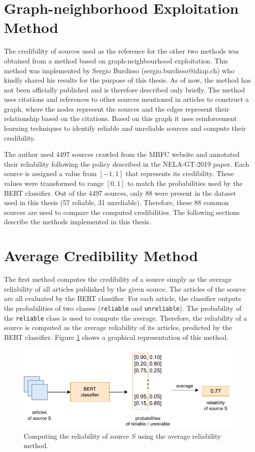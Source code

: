 \section{Graph-neighborhood Exploitation Method}
The credibility of sources used as the reference for the other two methods was obtained from a method based on graph-neighbourhood exploitation. This method was implemented by Sergio Burdisso (sergio.burdisso@idiap.ch) who kindly shared his results for the purpose of this thesis. As of now, the method has not been officially published and is therefore described only briefly. The method uses citations and references to other sources mentioned in articles to construct a graph, where the nodes represent the sources and the edges represent their relationship based on the citations. Based on this graph it uses reinforcement learning techniques to identify reliable and unreliable sources and compute their credibility. 

The author used 4497 sources crawled from the MBFC website and annotated their reliability following the policy described in the NELA-GT-2019 paper. Each source is assigned a value from $[-1, 1]$ that represents its credibility. These values were transformed to range $[0,1]$ to match the probabilities used by the BERT classifier. Out of the 4497 sources, only 88 were present in the dataset used in this thesis (57 reliable, 31 unreliable). Therefore, these 88 common sources are used to compare the computed credibilities. The following sections describe the methods implemented in this thesis.


\pagebreak

\section{Average Credibility Method}
The first method computes the credibility of a source simply as the average reliability of all articles published by the given source. The articles of the source are all evaluated by the BERT classifier. For each article, the classifier outputs the probabilities of two classes (\texttt{reliable} and \texttt{unreliable}). The probability of the \texttt{reliable} class is used to compute the average. Therefore, the reliability of a source is computed as the average reliability of its articles, predicted by the BERT classifier. Figure \ref{fig:avg_rel} shows a graphical representation of this method.

\begin{figure}[H]
    \centering
    \includegraphics[scale=0.9]{obrazky-figures/avg_reliability.pdf}
    \caption{Computing the reliability of source $S$ using the average reliability method.}
    \label{fig:avg_rel}
\end{figure}


